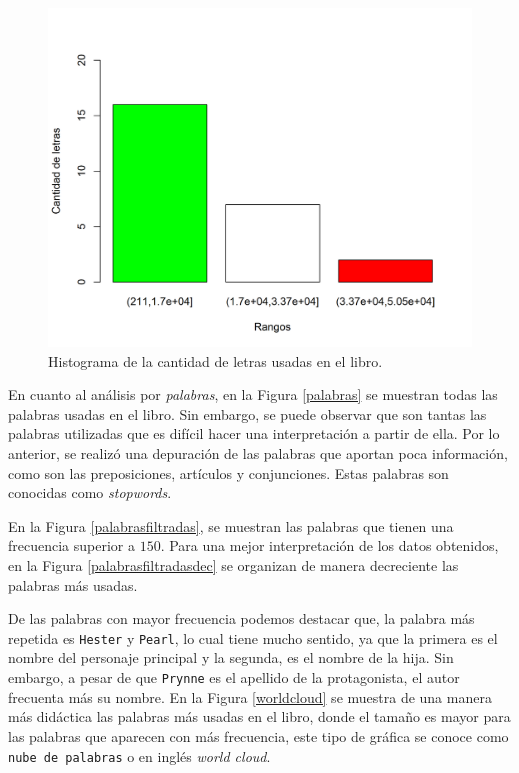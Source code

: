 \documentclass[fontsize=12pt]{article}
\begin{document}
\begin{figure}
\centering
\includegraphics[scale=0.6]{Figures/histDeLetrasFiltradas.png}
\caption{Histograma de la cantidad de letras usadas en el libro.}
\label{histograma}
\end{figure}

En cuanto al análisis por \emph{palabras}, en la Figura \ref{palabras} se muestran todas las palabras usadas en el libro. Sin embargo, se puede observar que son tantas las palabras utilizadas que es difícil hacer una interpretación a partir de ella. Por lo anterior, se realizó una depuración de las palabras que aportan poca información, como son las preposiciones, artículos y conjunciones. Estas palabras son conocidas como \textit{stopwords}. 

En la Figura \ref{palabrasfiltradas}, se muestran las palabras que tienen una frecuencia superior a $150$. Para una mejor interpretación de los datos obtenidos, en la Figura \ref{palabrasfiltradasdec} se organizan de manera decreciente las palabras más usadas. 

De las palabras con mayor frecuencia podemos destacar que, la palabra más repetida es \texttt{Hester} y \texttt{Pearl}, lo cual tiene mucho sentido, ya que la primera es el nombre del personaje principal y la segunda, es el nombre de la hija. Sin embargo, a pesar de que \texttt{Prynne} es el apellido de la protagonista, el autor frecuenta más su nombre. En la Figura \ref{worldcloud} se muestra de una manera más didáctica las palabras más usadas en el libro, donde el tamaño es mayor para las palabras que aparecen con más frecuencia, este tipo de gráfica se conoce como \texttt{nube de palabras} o en inglés \textit{world cloud}.
\end{document}
